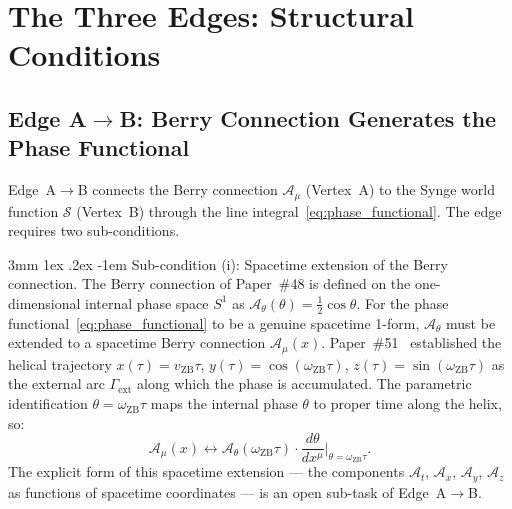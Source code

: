 \documentclass[%
 reprint, amsmath,amssymb, aps, prd, ]{revtex4-2}
\makeatletter
\numberwithin{equation}{section}
\renewcommand\paragraph{%
  \@startsection{paragraph}{4}{\z@}%
    {3mm \@plus 1ex \@minus .2ex}%
    {-1em}%
    {\normalfont\normalsize\itshape}}
\newcommand{\iphase}{\theta}
\newcommand{\omZB}{\omega_{\text{ZB}}}
\newcommand{\vZB}{v_{\mathrm{ZB}}}
\newcommand{\BerryA}{\mathcal{A}}
\newcommand{\SyngeS}{\mathcal{S}}
\makeatother
\begin{document}
\section{The Three Edges: Structural Conditions}
\label{sec:edges}

\subsection{Edge A$\to$B: Berry Connection Generates the Phase Functional}
\label{subsec:edgeI}

Edge~A$\to$B connects the Berry connection $\BerryA_\mu$ (Vertex~A) to the Synge world function $\SyngeS$ (Vertex~B) through the line integral~\eqref{eq:phase_functional}.
The edge requires two sub-conditions.

\paragraph{Sub-condition (i): Spacetime extension of the Berry connection.}
The Berry connection of Paper~\#48 is defined on the one-dimensional internal phase space $S^1$ as $\BerryA_\theta(\theta) = \tfrac{1}{2}\cos\theta$.
For the phase functional~\eqref{eq:phase_functional} to be a genuine spacetime 1-form, $\BerryA_\theta$ must be extended to a spacetime Berry connection $\BerryA_\mu(x)$.
Paper~\#51~\cite{hanamura51} established the helical trajectory $x(\tau) = \vZB\tau$, $y(\tau) = \cos(\omZB\tau)$, $z(\tau) = \sin(\omZB\tau)$ as the external arc $\Gamma_\mathrm{ext}$ along which the phase is accumulated.
The parametric identification $\iphase = \omZB\tau$ maps the internal phase $\iphase$ to proper time along the helix, so:
\begin{equation}
\BerryA_\mu(x) \leftrightarrow \BerryA_\theta(\omZB\tau) \cdot \frac{d\theta}{dx^\mu}\bigg|_{\iphase = \omZB\tau}.
\label{eq:connection_extension}
\end{equation}
The explicit form of this spacetime extension --- the components $\BerryA_t$, $\BerryA_x$, $\BerryA_y$, $\BerryA_z$ as functions of spacetime coordinates --- is an open sub-task of Edge~A$\to$B.
\end{document}
